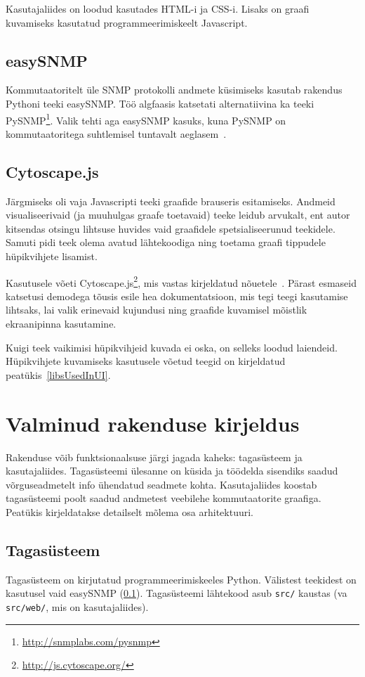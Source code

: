 \documentclass[12pt]{article}
\begin{document}
Kasutajaliides on loodud kasutades HTML-i ja CSS-i.
Lisaks on graafi kuvamiseks kasutatud programmeerimiskeelt Javascript.

\subsection{easySNMP} \label{easySNMP}
Kommutaatoritelt üle SNMP protokolli andmete küsimiseks kasutab rakendus Pythoni teeki easySNMP\@.
Töö algfaasis katsetati alternatiivina ka teeki PySNMP\footnote{\url{http://snmplabs.com/pysnmp}}.
Valik tehti aga easySNMP kasuks, kuna PySNMP on kommutaatoritega suhtlemisel tuntavalt aeglasem~\cite{EasySNMPDocs}.

\subsection{Cytoscape.js} \label{subsec:cyto}

Järgmiseks oli vaja Javascripti teeki graafide brauseris esitamiseks.
Andmeid visualiseerivaid (ja muuhulgas graafe toetavaid) teeke leidub arvukalt, ent autor kitsendas
otsingu lihtsuse huvides vaid graafidele spetsialiseerunud teekidele.
Samuti pidi teek olema avatud lähtekoodiga ning toetama graafi tippudele hüpikvihjete lisamist.

Kasutusele võeti Cytoscape.js\footnote{\url{http://js.cytoscape.org/}},
mis vastas kirjeldatud nõuetele~\cite{CytoscapeIntro}.
Pärast esmaseid katsetusi demodega tõusis esile hea dokumentatsioon, mis tegi teegi
kasutamise lihtsaks, lai valik erinevaid kujundusi ning graafide kuvamisel mõistlik
ekraanipinna kasutamine.

Kuigi teek vaikimisi hüpikvihjeid kuvada ei oska, on selleks loodud laiendeid.
Hüpikvihjete kuvamiseks kasutusele võetud teegid on kirjeldatud peatükis~\ref{libsUsedInUI}.

\newpage
\section{Valminud rakenduse kirjeldus} \label{description}
Rakenduse võib funktsionaalsuse järgi jagada kaheks: tagasüsteem ja kasutajaliides.
Tagasüsteemi ülesanne on küsida ja töödelda sisendiks saadud võrguseadmetelt info ühendatud
seadmete kohta.
Kasutajaliides koostab tagasüsteemi poolt saadud andmetest veebilehe kommutaatorite graafiga.
Peatükis kirjeldatakse detailselt mõlema osa arhitektuuri.

\subsection{Tagasüsteem}
Tagasüsteem on kirjutatud programmeerimiskeeles Python.
Välistest teekidest on kasutusel vaid easySNMP (\ref{easySNMP}).
Tagasüsteemi lähtekood asub \texttt{src/} kaustas (va \texttt{src/web/}, mis on kasutajaliides).
\end{document}
